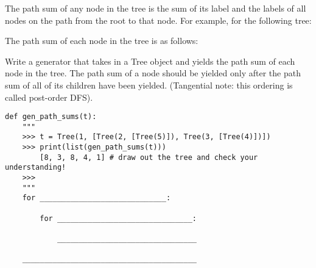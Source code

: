 \begin{blocksection}
\question The path sum of any node in the tree is the sum of its label and the labels of all nodes on the path from the root to that node. For example, for the following tree:

The path sum of each node in the tree is as follows:


Write a generator that takes in a Tree object and yields the path sum of each node in the tree. The path sum of a node should be yielded only after the path sum of all of its children have been yielded. (Tangential note: this ordering is called post-order DFS).
\end{blocksection}

\begin{blocksection}
\begin{lstlisting}
def gen_path_sums(t):
    """
    >>> t = Tree(1, [Tree(2, [Tree(5)]), Tree(3, [Tree(4)])])
    >>> print(list(gen_path_sums(t)))
       	[8, 3, 8, 4, 1] # draw out the tree and check your understanding!
    >>> 
    """    
    for _____________________________:

    	for _______________________________:

            ________________________________

    ________________________________________
\end{lstlisting}
\end{blocksection}

